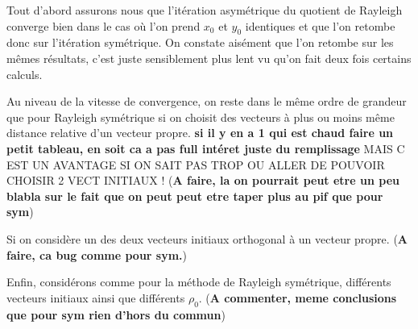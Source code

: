 	Tout d'abord assurons nous que l'itération asymétrique du quotient de Rayleigh converge bien dans le cas où l'on prend $x_0$ et $y_0$ identiques et que l'on retombe donc sur l'itération symétrique. On constate aisément que l'on retombe sur les mêmes résultats, c'est juste sensiblement plus lent vu qu'on fait deux fois certains calculs. 
	
	Au niveau de la vitesse de convergence, on reste dans le même ordre de grandeur que pour Rayleigh symétrique si on choisit des vecteurs à plus ou moins même distance relative d'un vecteur propre. \textbf{si il y en a 1 qui est chaud faire un petit tableau, en soit ca a pas full intéret juste du remplissage }
	MAIS C EST UN AVANTAGE SI ON  SAIT PAS TROP OU ALLER DE POUVOIR CHOISIR 2 VECT INITIAUX ! (\textbf{A faire, la on pourrait peut etre un peu blabla sur le fait que on peut peut etre taper plus au pif que pour sym})
	
	Si on considère un des deux vecteurs initiaux orthogonal à un vecteur propre. (\textbf{A faire, ca bug comme pour sym.})
	
	
	Enfin, considérons comme pour la méthode de Rayleigh symétrique, différents vecteurs initiaux ainsi que différents $\rho_0$. (\textbf{A commenter, meme conclusions que pour sym rien d'hors du commun})
	
	
	
